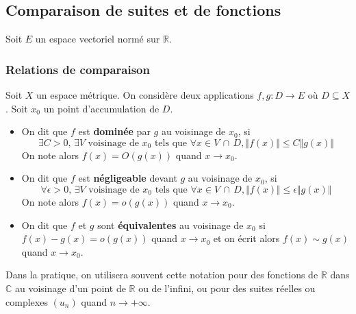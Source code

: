 




  \subsection{Comparaison de suites et de fonctions}


  Soit $E$ un espace vectoriel normé sur $\mathbb{R}$.

  \subsubsection{Relations de comparaison}

  \begin{definition}
    Soit $X$ un espace métrique. On considère deux applications $f, g : D \rightarrow E$ où $D \subseteq X$. Soit $x_0$ un point d'accumulation de $D$.
    \begin{itemize}
      \item On dit que $f$ est \textbf{dominée} par $g$ au voisinage de $x_0$, si
      \[ \exists C > 0, \, \exists V \text{ voisinage de } x_0 \text{ tels que } \forall x \in V \, \cap \, D, \Vert f(x) \Vert \leq C \Vert g(x) \Vert \]
      On note alors $f(x) = O(g(x))$ quand $x \rightarrow x_0$.
      \item On dit que $f$ est \textbf{négligeable} devant $g$ au voisinage de $x_0$, si
      \[ \forall \epsilon > 0, \, \exists V \text{ voisinage de } x_0 \text{ tels que } \forall x \in V \, \cap \, D, \Vert f(x) \Vert \leq \epsilon \Vert g(x) \Vert \]
      On note alors $f(x) = o(g(x))$ quand $x \rightarrow x_0$.
      \item On dit que $f$ et $g$ sont \textbf{équivalentes} au voisinage de $x_0$ si $f(x) - g(x) = o(g(x))$ quand $x \rightarrow x_0$ et on écrit alors $f(x) \sim g(x)$ quand $x \rightarrow x_0$.
    \end{itemize}
  \end{definition}

  \begin{remark}
    Dans la pratique, on utilisera souvent cette notation pour des fonctions de $\mathbb{R}$ dans $\mathbb{C}$ au voisinage d'un point de $\mathbb{R}$ ou de l'infini, ou pour des suites réelles ou complexes $(u_n)$ quand $n \rightarrow +\infty$.
  \end{remark}

